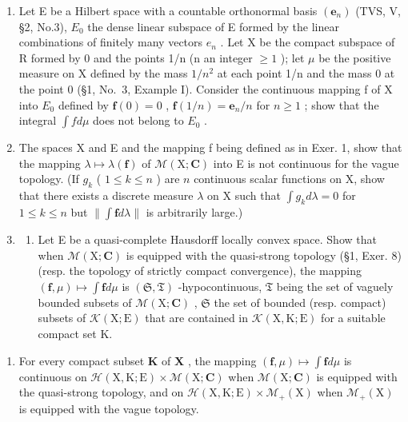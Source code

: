 \begin{enumerate}
\def\labelenumi{\arabic{enumi})}
\item
  Let E be a Hilbert space with a countable orthonormal basis \((\mathbf{e}_{n})\) (TVS, V, §2, No.3), \(E_{0}\) the dense linear subspace of E formed by the linear combinations of finitely many vectors \(e_{n}\) . Let X be the compact subspace of R formed by 0 and the points 1/n (n an integer \(\geqslant 1\) ); let \(\mu\) be the positive measure on X defined by the mass \(1/n^{2}\) at each point 1/n and the mass 0 at the point 0 (§1, No.~3, Example I). Consider the continuous mapping f of X into \(E_{0}\) defined by \(\mathbf{f}(0)=0\) , \(\mathbf{f}(1/n)=\mathbf{e}_{n}/n\) for \(n\geqslant1\) ; show that the integral \(\int f d\mu\) does not belong to \(E_{0}\) .
\item
  The spaces X and E and the mapping f being defined as in Exer. 1, show that the mapping \(\lambda \mapsto \lambda(\mathbf{f})\) of \(\mathcal{M}(\mathrm{X};\mathbf{C})\) into E is not continuous for the vague topology. (If \(g_{k}\) ( \(1 \leqslant k \leqslant n\) ) are \(n\) continuous scalar functions on X, show that there exists a discrete measure \(\lambda\) on X such that \(\int g_{k} d\lambda = 0\) for \(1 \leqslant k \leqslant n\) but \(\| \int \mathbf{f} d\lambda \|\) is arbitrarily large.)
\item
  \begin{enumerate}
  \def\labelenumii{\alph{enumii})}
  \tightlist
  \item
    Let E be a quasi-complete Hausdorff locally convex space. Show that when \(\mathcal{M}(\mathrm{X};\mathbf{C})\) is equipped with the quasi-strong topology (§1, Exer. 8) (resp. the topology of strictly compact convergence), the mapping \((\mathbf{f},\mu)\mapsto\int\mathbf{f}d\mu\) is \((\mathfrak{S},\mathfrak{T})\) -hypocontinuous, \(\mathfrak{T}\) being the set of vaguely bounded subsets of \(\mathcal{M}(\mathrm{X};\mathbf{C})\) , \(\mathfrak{S}\) the set of bounded (resp. compact) subsets of \(\mathcal{K}(\mathrm{X};\mathrm{E})\) that are contained in \(\mathcal{K}(\mathrm{X},\mathrm{K};\mathrm{E})\) for a suitable compact set K.
  \end{enumerate}
\end{enumerate}

\begin{enumerate}
\def\labelenumi{\alph{enumi})}
\setcounter{enumi}{1}
\tightlist
\item
  For every compact subset \(\mathbf{K}\) of \(\mathbf{X}\) , the mapping \((\mathbf{f},\mu)\mapsto \int \mathbf{f}d\mu\) is continuous on \(\mathcal{H}(\mathrm{X},\mathrm{K};\mathrm{E})\times \mathcal{M}(\mathrm{X};\mathbf{C})\) when \(\mathcal{M}(\mathrm{X};\mathbf{C})\) is equipped with the quasi-strong topology, and on \(\mathcal{H}(\mathrm{X},\mathrm{K};\mathrm{E})\times \mathcal{M}_{+}(\mathrm{X})\) when \(\mathcal{M}_{+}(\mathrm{X})\) is equipped with the vague topology.
\end{enumerate}

